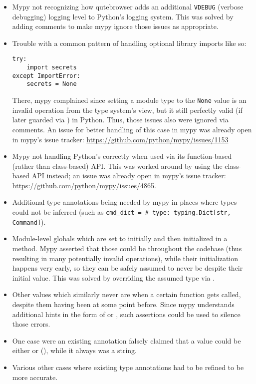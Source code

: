\begin{itemize}
  \item Mypy not recognizing how qutebrowser adds an additional \verb|VDEBUG|
    (verbose debugging) logging level to Python's logging system. This was
    solved by adding  comments to make mypy ignore those
    issues as appropriate.
  \item Trouble with a common pattern of handling optional library imports like so:
    \begin{verbatim}
try:
    import secrets
except ImportError:
    secrets = None
\end{verbatim}
    There, mypy complained since setting a module type to the
    \verb|None| value is an invalid operation from the type system's view, but
    it still perfectly valid (if later guarded via )
    in Python. Thus, those issues also were ignored via 
    comments. An issue for better handling of this case in mypy was already
    open in mypy's issue tracker: \url{https://github.com/python/mypy/issues/1153}
  \item Mypy not handling Python's  correctly when used via
    its function-based (rather than class-based) API. This was worked around by
    using the class-based API instead; an issue was already open in mypy's issue
    tracker: \url{https://github.com/python/mypy/issues/4865}.
  \item Additional type annotations being needed by mypy in places where types
    could not be inferred (such as \texttt{cmd_dict = {} # type: typing.Dict[str, Command]}).
  \item Module-level globals which are set to  initially and then
    initialized in a  method. Mypy asserted that those could be 
    throughout the codebase (thus resulting in many potentially invalid operations),
    while their initialization happens very early, so they can be safely assumed
    to never be  despite their initial value. This was solved by
    overriding the assumed type via .
  \item Other values which similarly never are  when a certain function
    gets called, despite them having been  at some point before. Since
    mypy understands additional hints in the form of  or , such assertions could be used
    to silence those errors.
  \item One case were an existing annotation falsely claimed that a value could
    be either  or  (), while it
    always was a string.
  \item Various other cases where existing type annotations had to be refined to
    be more accurate.
\end{itemize}

